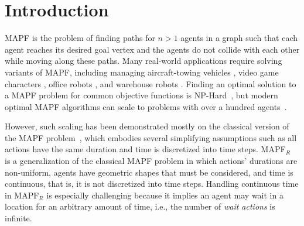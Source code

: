 \documentclass[letterpaper]{article} %
\newcommand{\mapfr}{{MAPF}$_R$\xspace}
\newcommand{\mapf}{\ac{MAPF}\xspace}
\begin{document}
\begin{abstract}

\end{abstract}

\section{Introduction}

\acf{MAPF} is the problem of finding paths for $n>1$ agents in a graph such that 
each agent reaches its desired goal vertex and the agents do not collide with each other while moving along these paths. 
Many real-world applications require solving variants of \mapf, 
including managing aircraft-towing vehicles \cite{MorrisPLMMKK16}, video game characters \cite{Silver05}, office robots \cite{VelosoBCR15}, and warehouse robots \cite{WurmanDM07}. 
Finding an optimal solution to a \mapf problem for common objective functions is NP-Hard~\cite{surynek2010optimization,yu2013structure}, 
but modern optimal \mapf algorithms can scale to problems with over a hundred agents~\cite{sharon2015conflict,BoyarskiFSSTBS15,felner2018adding,BCP,lazy-cbs,SurynekFSB16}.

However, such scaling has been demonstrated mostly on the classical version of the \mapf problem~\cite{stern2019multi}, which embodies several simplifying assumptions such as all actions have the same duration and time is discretized into time steps. \mapfr~\cite{walker2018extended} is a generalization of the classical \mapf problem in which actions' durations are non-uniform, agents have geometric shapes that must be considered, and time is continuous, that is, it is not discretized into time steps. 
Handling continuous time in \mapfr is especially challenging because it implies an agent may wait in a location for an arbitrary amount of time, i.e., the number of \emph{wait actions} is infinite.  
\end{document}
